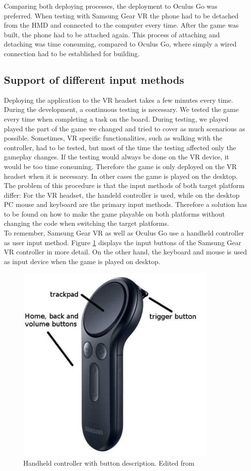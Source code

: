 Comparing both deploying processes, the deployment to Oculus Go was preferred. When testing with Samsung Gear VR the phone had to be detached from the HMD and connected to the computer every time. After the game was built, the phone had to be attached again. This process of attaching and detaching was time consuming, compared to Oculus Go, where simply a wired connection had to be established for building.
\subsection{Support of different input methods}
\label{inputmethods}
Deploying the application to the VR headset takes a few minutes every time. During the development, a continuous testing is necessary. We tested the game every time when completing a task on the board. During testing, we played played the part of the game we changed and tried to cover as much scenarious as possible. Sometimes, VR specific functionalities, such as walking with the controller, had to be tested, but most of the time the testing affected only the gameplay changes. If the testing would always be done on the VR device, it would be too time consuming. Therefore the game is only deployed on the VR headset when it is necessary. In other cases the game is played on the desktop. \\
The problem of this procedure is that the input methods of both target platform differ: For the VR headset, the handeld controller is used, while on the desktop PC mouse and keyboard are the primary input methods. Therefore a solution has to be found on how to make the game playable on both platforms without changing the code when switching the target platforms.\\ 
To remember, Samsung Gear VR as well as Oculus Go use a handheld controller as user input method. Figure \ref{fig:controller} displays the input buttons of the Samsung Gear VR controller in more detail. On the other hand, the keyboard and mouse is used as input device when the game is played on desktop.\\
\begin{figure}[h!]
  \includegraphics[width=10cm]{kapitel/eps/samsung-controller.pdf}
  \centering
  \caption{Handheld controller with button description. Edited from \cite{Samsung.2019b}}
  \label{fig:controller}
\end{figure}
